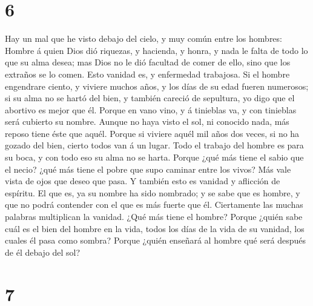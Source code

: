 \hypertarget{section-5}{%
\section{6}\label{section-5}}

 Hay un mal que he visto debajo del cielo, y muy común
entre los hombres:  Hombre á quien Dios dió riquezas, y
hacienda, y honra, y nada le falta de todo lo que su alma desea; mas
Dios no le dió facultad de comer de ello, sino que los extraños se lo
comen. Esto vanidad es, y enfermedad trabajosa.  Si el
hombre engendrare ciento, y viviere muchos años, y los días de su edad
fueren numerosos; si su alma no se hartó del bien, y también careció de
sepultura, yo digo que el abortivo es mejor que él. 
Porque en vano vino, y á tinieblas va, y con tinieblas será cubierto su
nombre.  Aunque no haya visto el sol, ni conocido nada,
más reposo tiene éste que aquél.  Porque si viviere aquél
mil años dos veces, si no ha gozado del bien, cierto todos van á un
lugar.  Todo el trabajo del hombre es para su boca, y con
todo eso su alma no se harta.  Porque ¿qué más tiene el
sabio que el necio? ¿qué más tiene el pobre que supo caminar entre los
vivos?  Más vale vista de ojos que deseo que pasa. Y
también esto es vanidad y aflicción de espíritu.  El que
es, ya su nombre ha sido nombrado; y se sabe que es hombre, y que no
podrá contender con el que es más fuerte que él. 
Ciertamente las muchas palabras multiplican la vanidad. ¿Qué más tiene
el hombre?  Porque ¿quién sabe cuál es el bien del hombre
en la vida, todos los días de la vida de su vanidad, los cuales él pasa
como sombra? Porque ¿quién enseñará al hombre qué será después de él
debajo del sol?

\hypertarget{section-6}{%
\section{7}\label{section-6}}

